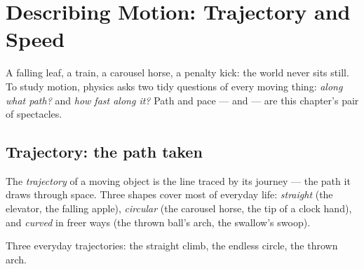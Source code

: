 \chapter{Describing Motion: Trajectory and Speed}\label{ch:g6:describing-motion}

A falling leaf, a  train, a carousel horse, a penalty
kick: the world never sits still. To study motion, physics asks
two tidy questions of every moving thing: \emph{along what path?}
and \emph{how fast along it?} Path and pace ---  and
 --- are this chapter's pair of spectacles.

\section{Trajectory: the path taken}

\begin{definition}[Trajectory]\label{def:g6:describing-motion:trajectory}
The \emph{trajectory} of a moving object is the
line traced by its journey --- the path it draws through space.
Three shapes cover most of everyday life:
\emph{straight} (the elevator, the
falling apple), \emph{circular} (the
carousel horse, the tip of a clock hand), and \emph{curved} in
freer ways (the thrown ball's arch, the swallow's swoop).
\end{definition}

\begin{omfigure}

{\small Three everyday trajectories: the straight climb, the
endless circle, the thrown arch.}
\end{omfigure}

